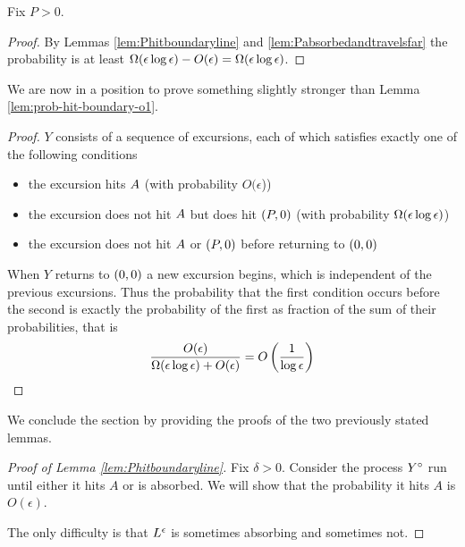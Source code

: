 {\begin{lemma*}
  Fix $P > 0$.  
\end{lemma*}

\begin{proof}
  By Lemmas \ref{lem:Phitboundaryline} and
  \ref{lem:Pabsorbedandtravelsfar} the probability is at least
  $\Omega(\epsilon\log\epsilon) - O(\epsilon) = \Omega(\epsilon\log\epsilon)$.
\end{proof}

We are now in a position to prove something slightly stronger than
Lemma \ref{lem:prob-hit-boundary-o1}.

\begin{lemma*}
\end{lemma*}

\newcommand{\Oe}{O(\epsilon)}

\begin{proof}
  $Y$ consists of a sequence of excursions, each of which satisfies
  exactly one of the following conditions
  \begin{itemize}
  \item the excursion hits $A$ (with probability
    $O(\epsilon$))
  \item the excursion does not hit $A$ but does hit
    $(P,0)$ (with probability $\Omega(\epsilon\log\epsilon)$)
  \item the excursion does not hit $A$ or $(P,0)$ before
    returning to $(0,0)$
  \end{itemize}
  When $Y$ returns to $(0,0)$ a new excursion begins, which is independent of
  the previous excursions.  Thus the probability that the first
  condition occurs before the second is exactly the probability of the
  first as fraction of the sum of their probabilities, that is
  \[
  \frac{\Oe}{\Omegaeloge + \Oe} = O\left(\frac{1}{\log\epsilon}\right)
  \]
\end{proof}

We conclude the section by providing the proofs of the two previously
stated lemmas.

\begin{proof}[Proof of Lemma \ref{lem:Phitboundaryline}]
Fix $\delta > 0$.  Consider the process $Y^\circ$ run until either
it hits $A$ or is absorbed.  We will show that the probability it
hits $A$ is $O(\epsilon)$.

The only difficulty is that $L^\epsilon$ is sometimes absorbing and
sometimes not.


\end{proof}}
